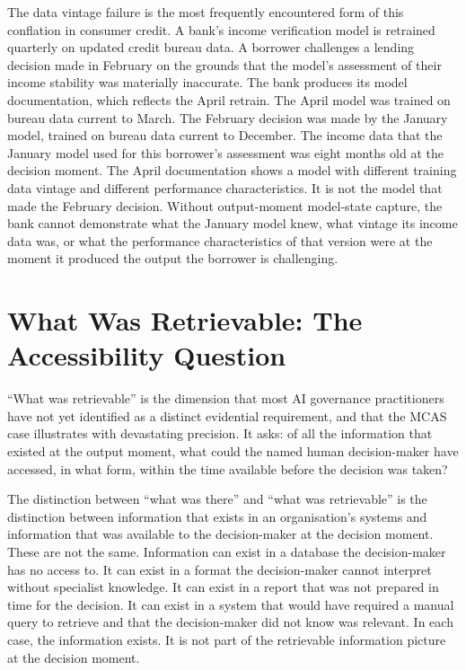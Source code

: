 The data vintage failure is the most frequently encountered form of this conflation in consumer credit. A bank's income verification model is retrained quarterly on updated credit bureau data. A borrower challenges a lending decision made in February on the grounds that the model's assessment of their income stability was materially inaccurate. The bank produces its model documentation, which reflects the April retrain. The April model was trained on bureau data current to March. The February decision was made by the January model, trained on bureau data current to December. The income data that the January model used for this borrower's assessment was eight months old at the decision moment. The April documentation shows a model with different training data vintage and different performance characteristics. It is not the model that made the February decision. Without output-moment model-state capture, the bank cannot demonstrate what the January model knew, what vintage its income data was, or what the performance characteristics of that version were at the moment it produced the output the borrower is challenging.

\scenebreak

\section{What Was Retrievable: The Accessibility Question}

``What was retrievable'' is the dimension that most AI governance practitioners have not yet identified as a distinct evidential requirement, and that the MCAS case illustrates with devastating precision. It asks: of all the information that existed at the output moment, what could the named human decision-maker have accessed, in what form, within the time available before the decision was taken?

The distinction between ``what was there'' and ``what was retrievable'' is the distinction between information that exists in an organisation's systems and information that was available to the decision-maker at the decision moment. These are not the same. Information can exist in a database the decision-maker has no access to. It can exist in a format the decision-maker cannot interpret without specialist knowledge. It can exist in a report that was not prepared in time for the decision. It can exist in a system that would have required a manual query to retrieve and that the decision-maker did not know was relevant. In each case, the information exists. It is not part of the retrievable information picture at the decision moment.


